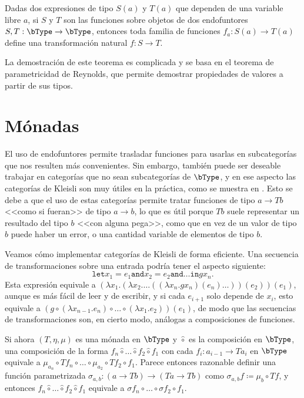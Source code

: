 \begin{theorem}
  Dadas dos expresiones de tipo $S(a)$ y $T(a)$ que dependen de una variable
  libre $a$, si $S$ y $T$ son las funciones sobre objetos de dos endofuntores
  $S,T:\bType\to\bType$, entonces toda familia de funciones $f_a:S(a)\to T(a)$
  define una transformación natural $f:S\to T$.
\end{theorem}

La demostración de este teorema es complicada y se basa en el teorema de
parametricidad de Reynolds\cite{typeabs}, que permite demostrar propiedades de
valores a partir de sus tipos.

\section{Mónadas}

El uso de endofuntores permite trasladar funciones para usarlas en subcategorías
que nos resulten más convenientes. Sin embargo, también puede ser deseable
trabajar en categorías que no sean subcategorías de $\bType$, y en ese aspecto
las categorías de Kleisli son muy útiles en la práctica, como se muestra en
\cite{monads}. Esto se debe a que el uso de estas categorías permite tratar
funciones de tipo $a\to Tb$ <<como si fueran>> de tipo $a\to b$, lo que es útil
porque $Tb$ suele representar un resultado del tipo $b$ <<con alguna pega>>,
como que en vez de un valor de tipo $b$ puede haber un error, o una cantidad
variable de elementos de tipo $b$.

Veamos cómo implementar categorías de Kleisli de forma eficiente. Una secuencia
de transformaciones sobre una entrada podría tener el aspecto siguiente:
\[
  \mathtt{let }x_1=e_1\mathtt{ and }x_2=e_2\mathtt{ and }\dots\mathtt{ in }gx_n.
\]
Esta expresión equivale a
$(\lambda x_1.(\lambda x_2.\dots((\lambda x_n.gx_n)(e_n)\dots))(e_2))(e_1)$,
aunque es más fácil de leer y de escribir, y si cada $e_{i+1}$ solo depende de
$x_i$, esto equivale a
$(g\circ(\lambda x_{n-1}.e_n)\circ\dots\circ(\lambda x_1.e_2))(e_1)$, de modo
que las secuencias de transformaciones son, en cierto modo, análogas a
composiciones de funciones.

Si ahora $(T,\eta,\mu)$ es una mónada en $\bType$ y $\hat\circ$ es la
composición en $\bType$, una composición de la forma
$f_n\hat\circ\dots\hat\circ f_2\hat\circ f_1$ con cada $f_i:a_{i-1}\to Ta_i$ en
$\bType$ equivale a
$\mu_{a_n}\circ Tf_n\circ\dots\circ\mu_{a_2}\circ Tf_2\circ f_1$. Parece
entonces razonable definir una función parametrizada
$\sigma_{a,b}:(a\to Tb)\to(Ta\to Tb)$ como
$\sigma_{a,b}f\coloneqq\mu_b\circ Tf$, y entonces
$f_n\hat\circ\dots\hat\circ f_2\hat\circ f_1$ equivale a
$\sigma f_n\circ\dots\circ\sigma f_2\circ f_1$.

